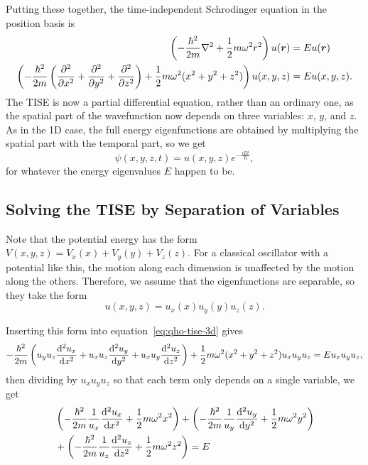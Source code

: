 \documentclass[../quantum_mechanics.tex]{subfiles}
\begin{document}
            Putting these together, the time-independent Schrodinger equation in the position basis is
            \begin{align}
                \left(-\frac{\hbar^2}{2m}\nabla^2+\frac{1}{2}m\omega^2r^2\right)u(\vec{r})&=Eu(\vec{r})\\
                \left(-\frac{\hbar^2}{2m}\left(\pdv[2]{}{x}+\pdv[2]{}{y}+\pdv[2]{}{z}\right)+\frac{1}{2}m\omega^2(x^2+y^2+z^2)\right)u(x,y,z)&=Eu(x,y,z).\label{eq:qho-tise-3d}
            \end{align}
            The TISE is now a partial differential equation, rather than an ordinary one, as the spatial part of the wavefunction now depends on three variables: $x$, $y$, and $z$.
            As in the 1D case, the full energy eigenfunctions are obtained by multiplying the spatial part with the temporal part, so we get
            \begin{equation}
                \psi(x,y,z,t)=u(x,y,z)e^{-\frac{iEt}{\hbar}},
            \end{equation}
            for whatever the energy eigenvalues $E$ happen to be.

        \subsection{Solving the TISE by Separation of Variables}\label{sec:the-3d-quantum-harmonic-oscillator:subsec:solving-the-tise-by-separation-of-variables}
            Note that the potential energy has the form $V(x,y,z)=V_x(x)+V_y(y)+V_z(z)$.
            For a classical oscillator with a potential like this, the motion along each dimension is unaffected by the motion along the others.
            Therefore, we assume that the eigenfunctions are separable, so they take the form
            \begin{equation}
                u(x,y,z)=u_x(x)u_y(y)u_z(z).
            \end{equation}
            
            Inserting this form into equation~\ref{eq:qho-tise-3d} gives
            \begin{equation}
                -\frac{\hbar^2}{2m}\left(u_yu_z\dv[2]{u_x}{x}+u_xu_z\dv[2]{u_y}{y}+u_xu_y\dv[2]{u_z}{z}\right)+\frac{1}{2}m\omega^2(x^2+y^2+z^2)u_xu_yu_z=Eu_xu_yu_z,
            \end{equation}
            then dividing by $u_xu_yu_z$ so that each term only depends on a single variable, we get
            \begin{equation}\label{eq:qho-tise-3d-separated}
                \begin{split}
                &\left(-\frac{\hbar^2}{2m}\frac{1}{u_x}\dv[2]{u_x}{x}+\frac{1}{2}m\omega^2x^2\right)+\left(-\frac{\hbar^2}{2m}\frac{1}{u_y}\dv[2]{u_y}{y}+\frac{1}{2}m\omega^2y^2\right)\\
                &+\left(-\frac{\hbar^2}{2m}\frac{1}{u_z}\dv[2]{u_z}{z}+\frac{1}{2}m\omega^2z^2\right)=E 
                \end{split}
            \end{equation}
\end{document}
